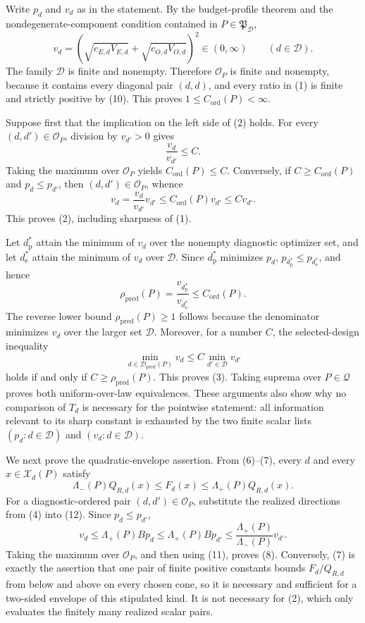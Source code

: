 Write \(p_d\) and \(v_d\) as in the statement.  By the budget-profile theorem and the nondegenerate-component condition contained in \(P\in\mathfrak P_{\mathcal D}\),
\[
 v_d
 =\left(\sqrt{c_{E,d}V_{E,d}}+\sqrt{c_{O,d}V_{O,d}}\right)^2
 \in(0,\infty)
 \qquad(d\in\mathcal D).
 \tag{10}
\]
The family \(\mathcal D\) is finite and nonempty.  Therefore \(\mathcal O_P\) is finite and nonempty, because it contains every diagonal pair \((d,d)\), and every ratio in (1) is finite and strictly positive by (10).  This proves
\(1\le C_{\mathrm{ord}}(P)<\infty\).

Suppose first that the implication on the left side of (2) holds.  For every \((d,d')\in\mathcal O_P\), division by \(v_{d'}>0\) gives
\[
 \frac{v_d}{v_{d'}}\le C.
\]
Taking the maximum over \(\mathcal O_P\) yields \(C_{\mathrm{ord}}(P)\le C\).  Conversely, if \(C\ge C_{\mathrm{ord}}(P)\) and \(p_d\le p_{d'}\), then \((d,d')\in\mathcal O_P\), whence
\[
 v_d
 =\frac{v_d}{v_{d'}}v_{d'}
 \le C_{\mathrm{ord}}(P)v_{d'}
 \le Cv_{d'}.
\]
This proves (2), including sharpness of (1).

Let \(d_{\mathrm p}^*\) attain the minimum of \(v_d\) over the nonempty diagnostic optimizer set, and let \(d_{\mathrm e}^*\) attain the minimum of \(v_d\) over \(\mathcal D\).  Since \(d_{\mathrm p}^*\) minimizes \(p_d\),
\(p_{d_{\mathrm p}^*}\le p_{d_{\mathrm e}^*}\), and hence
\[
 \rho_{\mathrm{pred}}(P)
 =\frac{v_{d_{\mathrm p}^*}}{v_{d_{\mathrm e}^*}}
 \le C_{\mathrm{ord}}(P).
 \tag{11}
\]
The reverse lower bound \(\rho_{\mathrm{pred}}(P)\ge1\) follows because the denominator minimizes \(v_d\) over the larger set \(\mathcal D\).  Moreover, for a number \(C\), the selected-design inequality
\[
 \min_{d\in\mathcal D_{\mathrm{pred}}(P)}v_d
 \le C\min_{d'\in\mathcal D}v_{d'}
\]
holds if and only if \(C\ge\rho_{\mathrm{pred}}(P)\).  This proves (3).  Taking suprema over \(P\in\mathcal Q\) proves both uniform-over-law equivalences.  These arguments also show why no comparison of \(T_d\) is necessary for the pointwise statement: all information relevant to its sharp constant is exhausted by the two finite scalar lists \((p_d:d\in\mathcal D)\) and \((v_d:d\in\mathcal D)\).

We next prove the quadratic-envelope assertion.  From (6)--(7), every \(d\) and every \(x\in\mathcal X_d(P)\) satisfy
\[
 \Lambda_-(P)Q_{R,d}(x)
 \le F_d(x)
 \le\Lambda_+(P)Q_{R,d}(x).
 \tag{12}
\]
For a diagnostic-ordered pair \((d,d')\in\mathcal O_P\), substitute the realized directions from (4) into (12).  Since \(p_d\le p_{d'}\),
\[
 v_d
 \le\Lambda_+(P)Bp_d
 \le\Lambda_+(P)Bp_{d'}
 \le\frac{\Lambda_+(P)}{\Lambda_-(P)}v_{d'}.
 \tag{13}
\]
Taking the maximum over \(\mathcal O_P\), and then using (11), proves (8).  Conversely, (7) is exactly the assertion that one pair of finite positive constants bounds \(F_d/Q_{R,d}\) from below and above on every chosen cone, so it is necessary and sufficient for a two-sided envelope of this stipulated kind.  It is not necessary for (2), which only evaluates the finitely many realized scalar pairs.

